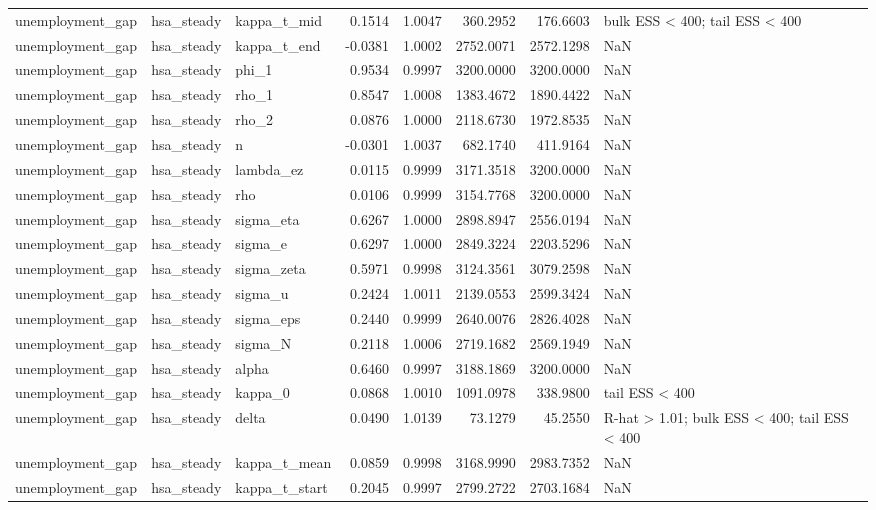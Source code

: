 \begin{tabular}{lllrrrrl}
unemployment\_gap & hsa\_steady & kappa\_t\_mid & 0.1514 & 1.0047 & 360.2952 & 176.6603 & bulk ESS < 400; tail ESS < 400 \\
unemployment\_gap & hsa\_steady & kappa\_t\_end & -0.0381 & 1.0002 & 2752.0071 & 2572.1298 & NaN \\
unemployment\_gap & hsa\_steady & phi\_1 & 0.9534 & 0.9997 & 3200.0000 & 3200.0000 & NaN \\
unemployment\_gap & hsa\_steady & rho\_1 & 0.8547 & 1.0008 & 1383.4672 & 1890.4422 & NaN \\
unemployment\_gap & hsa\_steady & rho\_2 & 0.0876 & 1.0000 & 2118.6730 & 1972.8535 & NaN \\
unemployment\_gap & hsa\_steady & n & -0.0301 & 1.0037 & 682.1740 & 411.9164 & NaN \\
unemployment\_gap & hsa\_steady & lambda\_ez & 0.0115 & 0.9999 & 3171.3518 & 3200.0000 & NaN \\
unemployment\_gap & hsa\_steady & rho & 0.0106 & 0.9999 & 3154.7768 & 3200.0000 & NaN \\
unemployment\_gap & hsa\_steady & sigma\_eta & 0.6267 & 1.0000 & 2898.8947 & 2556.0194 & NaN \\
unemployment\_gap & hsa\_steady & sigma\_e & 0.6297 & 1.0000 & 2849.3224 & 2203.5296 & NaN \\
unemployment\_gap & hsa\_steady & sigma\_zeta & 0.5971 & 0.9998 & 3124.3561 & 3079.2598 & NaN \\
unemployment\_gap & hsa\_steady & sigma\_u & 0.2424 & 1.0011 & 2139.0553 & 2599.3424 & NaN \\
unemployment\_gap & hsa\_steady & sigma\_eps & 0.2440 & 0.9999 & 2640.0076 & 2826.4028 & NaN \\
unemployment\_gap & hsa\_steady & sigma\_N & 0.2118 & 1.0006 & 2719.1682 & 2569.1949 & NaN \\
unemployment\_gap & hsa\_steady & alpha & 0.6460 & 0.9997 & 3188.1869 & 3200.0000 & NaN \\
unemployment\_gap & hsa\_steady & kappa\_0 & 0.0868 & 1.0010 & 1091.0978 & 338.9800 & tail ESS < 400 \\
unemployment\_gap & hsa\_steady & delta & 0.0490 & 1.0139 & 73.1279 & 45.2550 & R-hat > 1.01; bulk ESS < 400; tail ESS < 400 \\
unemployment\_gap & hsa\_steady & kappa\_t\_mean & 0.0859 & 0.9998 & 3168.9990 & 2983.7352 & NaN \\
unemployment\_gap & hsa\_steady & kappa\_t\_start & 0.2045 & 0.9997 & 2799.2722 & 2703.1684 & NaN \\

\end{tabular}
